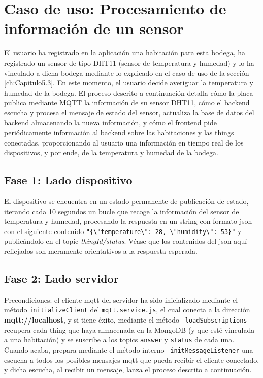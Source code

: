 \section{Caso de uso: Procesamiento de información de un sensor}
\label{ch:Capitulo5.4}
El usuario ha registrado en la aplicación una habitación para esta bodega, ha registrado un sensor de tipo DHT11 (sensor de temperatura y humedad) y lo ha vinculado a dicha bodega mediante lo explicado en el caso de uso de la sección \ref{ch:Capitulo5.3}. En este momento, el usuario decide averiguar la temperatura y humedad de la bodega. El proceso descrito a continuación detalla cómo la placa publica mediante MQTT la información de su sensor DHT11, cómo el backend escucha y procesa el mensaje de estado del sensor, actualiza la base de datos del backend almacenando la nueva información, y cómo el frontend pide periódicamente información al backend sobre las habitaciones y las things conectadas, proporcionando al usuario una información en tiempo real de los dispositivos, y por ende, de la temperatura y humedad de la bodega.

\subsection{Fase 1: Lado dispositivo}
\label{ch:Capitulo5.4.1}
El dispositivo se encuentra en un estado permanente de publicación de estado, iterando cada 10 segundos un bucle que recoge la información del sensor de temperatura y humedad, procesando la respuesta en un string con formato \gls{json} con el siguiente contenido \verb|"{\"temperature\": 28, \"humidity\": 53}"| y publicándolo en el topic \textit{thingId/status}. Véase que los contenidos del \gls{json} aquí reflejados son meramente orientativos a la respuesta esperada.

\subsection{Fase 2: Lado servidor}
\label{ch:Capitulo5.4.2}
Precondiciones: el cliente \gls{mqtt} del servidor ha sido inicializado mediante el método \verb|initializeClient| del \verb|mqtt.service.js|, el cual conecta a la dirección \textbf{mqtt://localhost}, y si tiene éxito, mediante el método \verb|_loadSubscriptions| recupera cada thing que haya almacenada en la MongoDB (y que esté vinculada a una habitación) y se suscribe a los topics \verb|answer| y \verb|status| de cada una. Cuando acaba, prepara mediante el método interno \verb|_initMessageListener| una escucha a todos los posibles mensajes \gls{mqtt} que pueda recibir el cliente conectado, y dicha escucha, al recibir un mensaje, lanza el proceso descrito a continuación.

